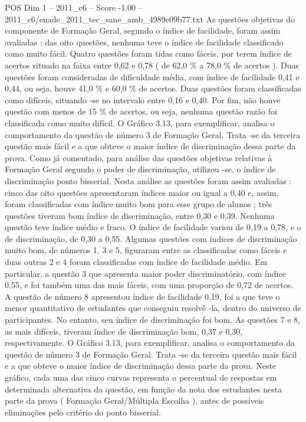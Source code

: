 \begin{textsample}{POS Dim 1 – 2011\_c6 – Score -1.00 – 2011\_c6/enade\_2011\_tec\_sane\_amb\_4989e09b77.txt}
As questões objetivas do componente de Formação Geral, segundo o índice de facilidade, foram assim avaliadas : das oito questões, nenhuma teve o índice de facilidade classificado como muito fácil.
Quatro questões foram tidas como fáceis, por terem índice de acertos situado na faixa entre 0,62 e 0,78 ( de 62,0 \% a 78,0 \% de acertos ).
Duas questões foram consideradas de dificuldade média, com índice de facilidade 0,41 e 0,44, ou seja, houve 41,0 \% e 60,0 \% de acertos.
Duas questões foram classificadas como difíceis, situando -se no intervalo entre 0,16 e 0,40.
Por fim, não houve questão com menos de 15 \% de acertos, ou seja, nenhuma questão razão foi classificada como muito difícil.
O Gráfico 3.13, para exemplificar, analisa o comportamento da questão de número 3 de Formação Geral.
Trata -se da terceira questão mais fácil e a que obteve o maior índice de discriminação dessa parte da prova.
Como já comentado, para análise das questões objetivas relativas à Formação Geral segundo o poder de discriminação, utilizou -se, o índice de discriminação ponto bisserial.
Nesta análise as questões foram assim avaliadas : cinco das oito questões apresentaram índices maior ou igual a 0,40 e, assim, foram classificadas com índice muito bom para esse grupo de alunos ; três questões tiveram bom índice de discriminação, entre 0,30 e 0,39.
Nenhuma questão teve índice médio e fraco.
O índice de facilidade variou de 0,19 a 0,78, e o de discriminação, de 0,30 a 0,55.
Algumas questões com índices de discriminação muito bom, de números 1, 3 e 5, figuraram entre as classificadas como fáceis e duas outras 2 e 4 foram classificadas com índice de facilidade médio.
Em particular, a questão 3 que apresenta maior poder discriminatório, com índice 0,55, e foi também uma das mais fáceis, com uma proporção de 0,72 de acertos.
A questão de número 8 apresentou índice de facilidade 0,19, foi a que teve o menor quantitativo de estudantes que conseguiu resolvê -la, dentro do universo de participantes.
No entanto, seu índice de discriminação foi bom.
As questões 7 e 8, as mais difíceis, tiveram índice de discriminação bom, 0,37 e 0,30, respectivamente.
O Gráfico 3.13, para exemplificar, analisa o comportamento da questão de número 3 de Formação Geral.
Trata -se da terceira questão mais fácil e a que obteve o maior índice de discriminação dessa parte da prova.
Neste gráfico, cada uma das cinco curvas representa o percentual de respostas em determinada alternativa da questão, em função da nota dos estudantes nesta parte da prova ( Formação Geral/Múltipla Escolha ), antes de possíveis eliminações pelo critério do ponto bisserial.

\end{textsample}
